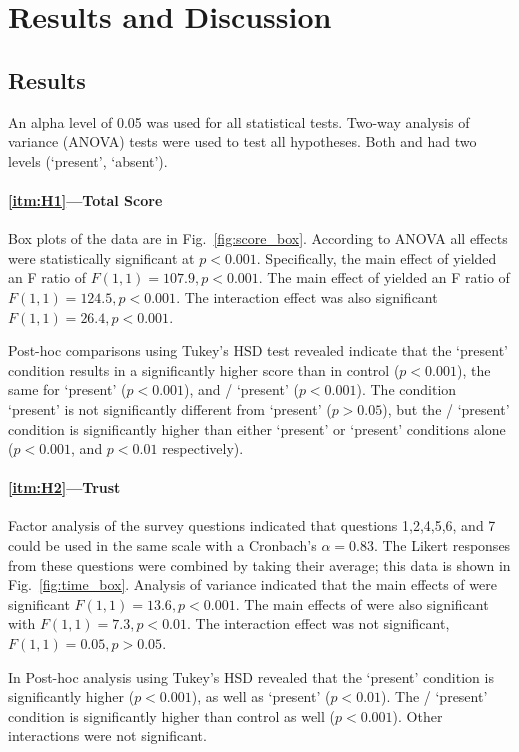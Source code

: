 \section{Results and Discussion} \label{sec:results}
\subsection{Results}
An alpha level of 0.05 was used for all statistical tests. Two-way analysis of variance (ANOVA) tests were used to test all hypotheses. Both \xQ{} and \xO had two levels (`present', `absent').

\paragraph{\ref{itm:H1}---Total Score}
Box plots of the data are in Fig.~\ref{fig:score_box}. According to ANOVA all effects were statistically significant at $p<0.001$. Specifically, the main effect of \xQ{} yielded an F ratio of $F(1,1)=107.9, p<0.001$. The main effect of \xO{} yielded an F ratio of $F(1,1)=124.5,p<0.001$. The interaction effect was also significant $F(1,1)=26.4,p<0.001$.

Post-hoc comparisons using Tukey's HSD test revealed indicate that the \xQ{} `present' condition results in a significantly higher score than in control ($p<0.001$), the same for \xO{} `present' ($p<0.001$), and \xQ/\xO{} `present' ($p<0.001$). The condition \xQ{} `present' is not significantly different from \xO{} `present' ($p>0.05$), but the \xQ/\xO{} `present' condition is significantly higher than either \xQ{} `present' or \xO{} `present' conditions alone ($p<0.001$, and $p<0.01$ respectively).

\paragraph{\ref{itm:H2}---Trust}
Factor analysis of the survey questions indicated that questions 1,2,4,5,6, and 7 could be used in the same scale with a Cronbach's $\alpha = 0.83$. The Likert responses from these questions were combined by taking their average; this data is shown in Fig.~\ref{fig:time_box}. Analysis of variance indicated that the main effects of \xQ{} were significant $F(1,1)=13.6,p<0.001$. The main effects of \xO{} were also significant with $F(1,1)=7.3,p<0.01$. The interaction effect was not significant, $F(1,1)=0.05,p>0.05$.

In Post-hoc analysis using Tukey's HSD revealed that the \xQ{} `present' condition is significantly higher ($p<0.001$), as well as \xO{} `present' ($p<0.01$). The \xQ/\xO{} `present' condition is significantly higher than control as well ($p<0.001$). Other interactions were not significant.

